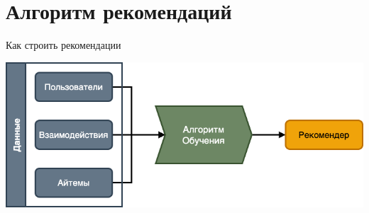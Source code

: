 \documentclass[11pt,aspectratio=169]{beamer}
\begin{document}
\section{Алгоритм рекомендаций}

{
\begin{frame}[plain]
\end{frame}
}

\begin{frame}{Как строить рекомендации}

\begin{center}

\begin{center}
\includegraphics[scale=0.35]{images/learning.png}
\end{center}

\end{center}

\end{frame}
\end{document}
